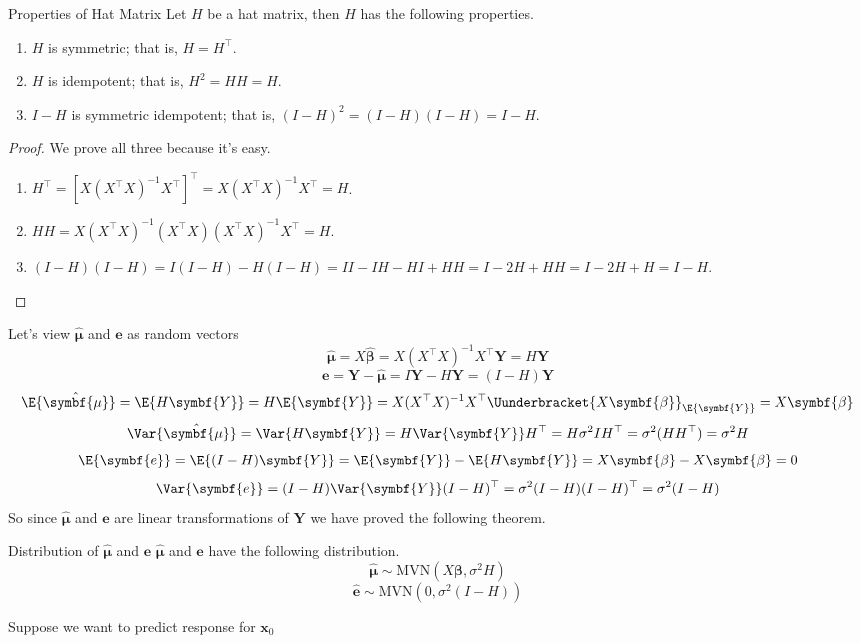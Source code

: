 \begin{Proposition}{Properties of Hat Matrix}{}
    Let $ H $ be a hat matrix, then $ H $ has the following properties.
    \begin{enumerate}[label=(\arabic*)]
        \item $ H $ is symmetric; that is, $ H=H^\top $.
        \item $ H $ is idempotent; that is, $ H^2=HH=H $.
        \item $ I-H $ is symmetric idempotent; that is,
              $ (I-H)^2=(I-H)(I-H)=I-H $.
    \end{enumerate}
\end{Proposition}
\begin{proof} We prove all three because it's easy.
    \begin{enumerate}[label=(\arabic*)]
        \item $ H^\top=[X(X^\top X)^{-1}X^\top]^\top=X(X^\top X)^{-1}X^\top=H $.
        \item  $ HH=X(X^\top X)^{-1}(X^\top X)(X^\top X)^{-1}X^\top=H $.
        \item  $ (I-H)(I-H)=I(I-H)-H(I-H)=II-IH-HI+HH=I-2H+HH=I-2H+H=I-H $.
    \end{enumerate}
\end{proof}
Let's view $ \hat{\symbf{\mu}} $ and $ \symbf{e} $
as random vectors
\[ \hat{\symbf{\mu}}=X\hat{\symbf{\beta}}=
    X(X^\top X)^{-1}X^\top \symbf{Y}=H\symbf{Y} \]
\[ \symbf{e}=\symbf{Y}-\hat{\symbf{\mu}}=I\symbf{Y}-H\symbf{Y}=
    (I-H)\symbf{Y} \]
\[ \E{\hat{\symbf{\mu}}}=\E{H\symbf{Y}}=H\E{\symbf{Y}}=
    X(X^\top X)^{-1}X^\top \Uunderbracket{X\symbf{\beta}}_{\E{\symbf{Y}}}
    =X\symbf{\beta}
\]
\[ \Var{\hat{\symbf{\mu}}}=\Var{H\symbf{Y}}=
    H\Var{\symbf{Y}}H^\top=H\sigma^2I H^\top=\sigma^2(HH^\top)=\sigma^2H \]
\[ \E{ \symbf{e}}=
    \E{(I-H)\symbf{Y}}=\E{\symbf{Y}}-\E{H\symbf{Y}}=X\symbf{\beta}-X\symbf{\beta}=0 \]
\[ \Var{\symbf{e}}=
    (I-H)\Var{\symbf{Y}}(I-H)^\top=\sigma^2(I-H)(I-H)^\top=\sigma^2(I-H) \]
So since $ \hat{\symbf{\mu}} $ and $ \symbf{e} $
are linear transformations of $ \symbf{Y} $ we have proved the following theorem.
\begin{Theorem}{Distribution of $ \hat{\symbf{\mu}} $ and $ \symbf{e} $}{}
    $ \hat{\symbf{\mu}} $ and $ \symbf{e} $ have the following distribution.
    \[ \hat{\symbf{\mu}}\sim\text{MVN}(X\symbf{\beta},\sigma^2 H) \]
    \[ \hat{\symbf{e}}\sim\text{MVN}(0,\sigma^2(I-H)) \]
\end{Theorem}
Suppose we want to predict response for $ \symbf{x}_0 $
